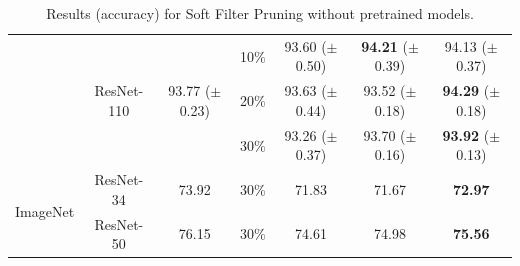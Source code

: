 \begin{table}[!htbp]
{\begin{tabular}{c|c|ccccc}
                           & \multirow{3}{*}{ResNet-110} & \multirow{3}{*}{93.77 ($\pm$0.23)}  & 10\%        & 93.60 ($\pm$0.50) & \textbf{94.21} ($\pm$0.39) & 94.13 ($\pm$0.37) \\
                           &                             & \multicolumn{1}{l}{} & 20\%        & 93.63 ($\pm$0.44) & 93.52 ($\pm$0.18) & \textbf{94.29} ($\pm$0.18) \\
                           &                             & \multicolumn{1}{l}{} & 30\%        & 93.26 ($\pm$0.37) & 93.70 ($\pm$0.16) & \textbf{93.92} ($\pm$0.13) \\ \hline
\multirow{2}{*}{ImageNet}  & ResNet-34                   & 73.92                & 30\%        & 71.83       & 71.67       & \textbf{72.97}       \\ \cline{2-7} 
                           & ResNet-50                   & 76.15                & 30\%        & 74.61       & 74.98       & \textbf{75.56}       \\ \hline
\end{tabular}
}
\vspace{2ex}
\caption{Results (accuracy) for Soft Filter Pruning \citep{he2018sfp} without pretrained models.}
\label{sfp-1}
\end{table}

\setlength{\tabcolsep}{4pt}
\renewcommand{\arraystretch}{1.25}
\begin{table}[!htbp]
\vspace{-1ex}
\centering
\small
{}
\vspace{2ex}
\caption{Results (accuracy) for Soft Filter Pruning \citep{he2018sfp} using pretrained models.}
\label{sfp-2}
\end{table}




